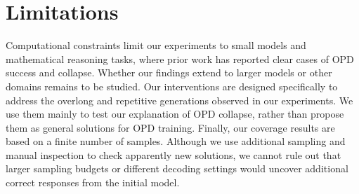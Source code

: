 \section*{Limitations}

Computational constraints limit our experiments to small models and mathematical reasoning tasks, where prior work has reported clear cases of OPD success and collapse. Whether our findings extend to larger models or other domains remains to be studied.
Our interventions are designed specifically to address the overlong and repetitive generations observed in our experiments. We use them mainly to test our explanation of OPD collapse, rather than propose them as general solutions for OPD training.
Finally, our coverage results are based on a finite number of samples. Although we use additional sampling and manual inspection to check apparently new solutions, we cannot rule out that larger sampling budgets or different decoding settings would uncover additional correct responses from the initial model.
